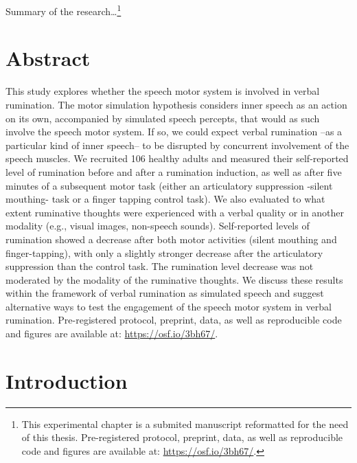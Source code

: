 \documentclass[a4paper,12pt,twoside,openright,oldfontcommands]{memoir}
\let\rmarkdownfootnote\footnote%
\def\footnote{\protect\rmarkdownfootnote}
\begin{document}
Summary of the research\ldots{}\footnote{This experimental chapter is a submited manuscript reformatted for the need of this thesis. Pre-registered protocol, preprint, data, as well as reproducible code and figures are available at: \url{https://osf.io/3bh67/}.}

\hypertarget{abstract-3}{%
\section{Abstract}\label{abstract-3}}

This study explores whether the speech motor system is involved in verbal rumination. The motor simulation hypothesis considers inner speech as an action on its own, accompanied by simulated speech percepts, that would as such involve the speech motor system. If so, we could expect verbal rumination --as a particular kind of inner speech-- to be disrupted by concurrent involvement of the speech muscles. We recruited 106 healthy adults and measured their self-reported level of rumination before and after a rumination induction, as well as after five minutes of a subsequent motor task (either an articulatory suppression -silent mouthing- task or a finger tapping control task). We also evaluated to what extent ruminative thoughts were experienced with a verbal quality or in another modality (e.g., visual images, non-speech sounds). Self-reported levels of rumination showed a decrease after both motor activities (silent mouthing and finger-tapping), with only a slightly stronger decrease after the articulatory suppression than the control task. The rumination level decrease was not moderated by the modality of the ruminative thoughts. We discuss these results within the framework of verbal rumination as simulated speech and suggest alternative ways to test the engagement of the speech motor system in verbal rumination. Pre-registered protocol, preprint, data, as well as reproducible code and figures are available at: \url{https://osf.io/3bh67/}.

\hypertarget{introduction-3}{%
\section{Introduction}\label{introduction-3}}
\end{document}
